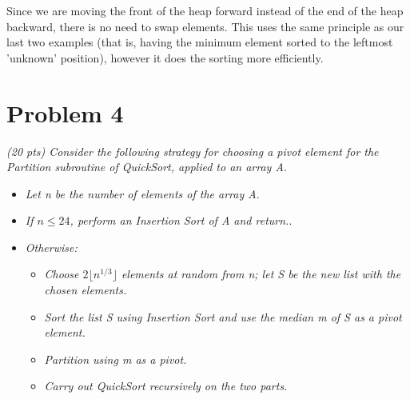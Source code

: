 \documentclass[11pt]{article} \setlength{\oddsidemargin}{0in}
\begin{document}
{\begin{enumerate}
    Since we are moving the front of the heap forward instead of the end of the heap backward, there is no need to swap elements. This uses the same principle as our last two examples (that is, having the minimum element sorted to the leftmost 'unknown' position), however it does the sorting more efficiently.
  
  \end{enumerate}

  \newpage
  \section*{Problem 4}

  \textit{(20 pts) Consider the following strategy for choosing a pivot
    element for the Partition subroutine of QuickSort, applied to an
    array A.}

  \begin{itemize}
  \item \textit{Let n be the number of elements of the array A}.
  \item \textit{If $n \le 24$, perform an Insertion Sort of A and
      return.}.
  \item \textit{Otherwise:}
    \begin{itemize}
    \item \textit{Choose $ 2 \lfloor n^{1/3} \rfloor $ elements at random from n;
        let S be the new list with the chosen elements.}
    \item \textit{Sort the list S using Insertion Sort and use the
        median m of S as a pivot element.}
    \item \textit{Partition using m as a pivot.}
    \item \textit{Carry out QuickSort recursively on the two parts.}
    \end{itemize}
  \end{itemize}

}
\end{document}
